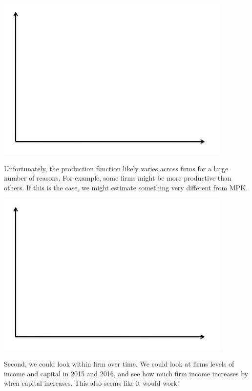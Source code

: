 \documentclass[12pt,english]{article}
\begin{document}
\begin{center}
	\begin{adjustbox}{
			max width=0.65\textwidth,
		}
		\includegraphics{axes.png}
	\end{adjustbox}
\end{center}

Unfortunately, the production function likely varies across firms for a large number of reasons. For example, some firms might be more productive than others. If this is the case, we might estimate something very different from MPK.

\begin{center}
	\begin{adjustbox}{
			max width=0.65\textwidth,
		}
		\includegraphics{axes.png}
	\end{adjustbox}
\end{center}

Second, we could look within firm over time. We could look at firms levels of income and capital in 2015 and 2016, and see how much firm income increases by when capital increases. This also seems like it would work!
\end{document}
